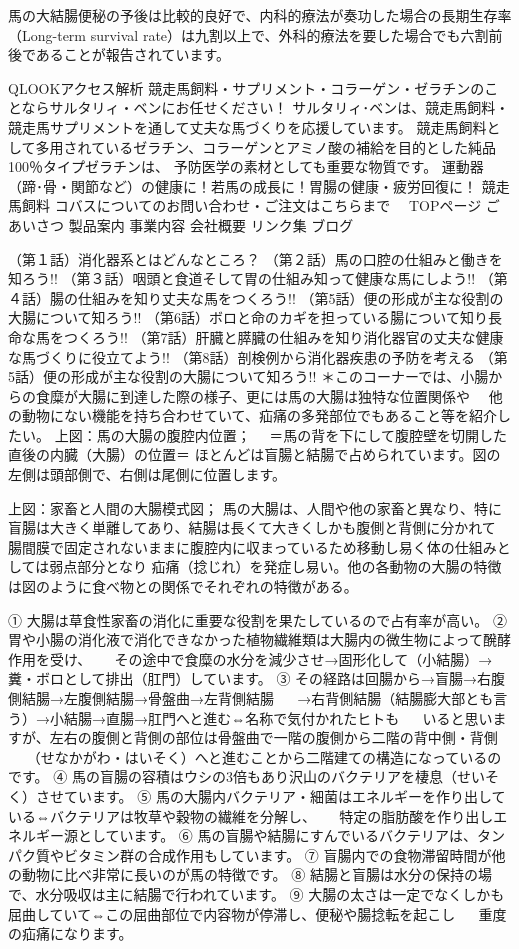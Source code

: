 馬の大結腸便秘の予後は比較的良好で、内科的療法が奏功した場合の長期生存率（Long-term survival rate）は九割以上で、外科的療法を要した場合でも六割前後であることが報告されています。





QLOOKアクセス解析
競走馬飼料・サプリメント・コラーゲン・ゼラチンのことならサルタリィ・ベンにお任せください！
サルタリィ･ベンは、競走馬飼料・競走馬サプリメントを通して丈夫な馬づくりを応援しています。
競走馬飼料として多用されているゼラチン、コラーゲンとアミノ酸の補給を目的とした純品100％タイプゼラチンは、
予防医学の素材としても重要な物質です。
運動器（蹄･骨・関節など）の健康に！若馬の成長に！胃腸の健康・疲労回復に！
競走馬飼料 コバスについてのお問い合わせ・ご注文はこちらまで　
	TOPページ 	ごあいさつ 	製品案内 	事業内容 	会社概要 	リンク集 	ブログ 	

（第１話）消化器系とはどんなところ？
（第２話）馬の口腔の仕組みと働きを知ろう!!
（第３話）咽頭と食道そして胃の仕組み知って健康な馬にしよう!!
（第４話）腸の仕組みを知り丈夫な馬をつくろう!!
（第5話）便の形成が主な役割の大腸について知ろう!!
（第6話）ボロと命のカギを担っている腸について知り長命な馬をつくろう!!
（第7話）肝臓と膵臓の仕組みを知り消化器官の丈夫な健康な馬づくりに役立てよう!!
（第8話）剖検例から消化器疾患の予防を考える
（第5話）便の形成が主な役割の大腸について知ろう!!
＊このコーナーでは、小腸からの食糜が大腸に到達した際の様子、更には馬の大腸は独特な位置関係や
　他の動物にない機能を持ち合わせていて、疝痛の多発部位でもあること等を紹介したい。
上図：馬の大腸の腹腔内位置；
　＝馬の背を下にして腹腔壁を切開した直後の内臓（大腸）の位置＝
ほとんどは盲腸と結腸で占められています。図の左側は頭部側で、右側は尾側に位置します。

上図：家畜と人間の大腸模式図；
馬の大腸は、人間や他の家畜と異なり、特に盲腸は大きく単離してあり、結腸は長くて大きくしかも腹側と背側に分かれて
腸間膜で固定されないままに腹腔内に収まっているため移動し易く体の仕組みとしては弱点部分となり
疝痛（捻じれ）を発症し易い。他の各動物の大腸の特徴は図のように食べ物との関係でそれぞれの特徴がある。

① 大腸は草食性家畜の消化に重要な役割を果たしているので占有率が高い。
② 胃や小腸の消化液で消化できなかった植物繊維類は大腸内の微生物によって醗酵作用を受け、
　 その途中で食糜の水分を減少させ→固形化して（小結腸）→糞・ボロとして排出（肛門）しています。
③ その経路は回腸から→盲腸→右腹側結腸→左腹側結腸→骨盤曲→左背側結腸
　 →右背側結腸（結腸膨大部とも言う）→小結腸→直腸→肛門へと進む⇔名称で気付かれたヒトも
　 いると思いますが、左右の腹側と背側の部位は骨盤曲で一階の腹側から二階の背中側・背側
　 （せなかがわ・はいそく）へと進むことから二階建ての構造になっているのです。
④ 馬の盲腸の容積はウシの3倍もあり沢山のバクテリアを棲息（せいそく）させています。
⑤ 馬の大腸内バクテリア・細菌はエネルギーを作り出している⇔バクテリアは牧草や穀物の繊維を分解し、
　 特定の脂肪酸を作り出しエネルギー源としています。
⑥ 馬の盲腸や結腸にすんでいるバクテリアは、タンパク質やビタミン群の合成作用もしています。
⑦ 盲腸内での食物滞留時間が他の動物に比べ非常に長いのが馬の特徴です。
⑧ 結腸と盲腸は水分の保持の場で、水分吸収は主に結腸で行われています。
⑨ 大腸の太さは一定でなくしかも屈曲していて⇔この屈曲部位で内容物が停滞し、便秘や腸捻転を起こし
　 重度の疝痛になります。

